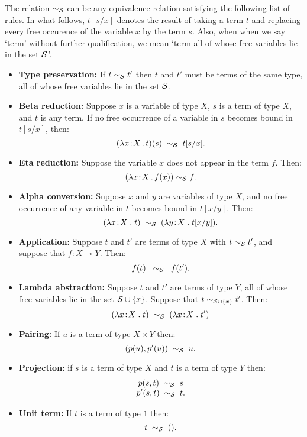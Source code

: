 \documentclass[12pt]{article}
\newcommand{\lhom}{\multimap}
\begin{document}
The relation $\sim_{\cal S}$ can be any equivalence relation
satisfying the following list of rules.  In what follows, $t[s/x]$
denotes the result of taking a term $t$ and replacing every free
occurence of the variable $x$ by the term $s$.  Also, when when we say
`term' without further qualification, we mean `term all of whose free
variables lie in the set ${\cal S}$'.
\begin{itemize}
\item {\bf Type preservation:} If $t \sim_{\cal S} t'$ then 
$t$ and $t'$ must be terms of the same type, all of whose free variables
lie in the set $\cal S$.
\item {\bf Beta reduction:} Suppose $x$ is a variable of
type $X$, $s$ is a term of type $X$, and $t$ is any term.
If no free occurrence of a variable 
in $s$ becomes bound in $t[s/x]$, then:
\[    (\lambda x\!:\!X\,.\, t)(s) { \;\; {\sim}_{\cal S} \;\; } t[s/x] .\]
\item {\bf Eta reduction:} Suppose the variable $x$ does not appear in the 
term $f$.  Then:
\[        (\lambda x\! : \! X \, .\, f(x)) {\; {\sim}_{\cal S} \; } f . \]
\item {\bf Alpha conversion:}  Suppose $x$ and $y$ are variables of
type $X$, and no free occurrence of any variable in $t$ becomes bound 
in $t[x/y]$.  Then:
\[        (\lambda x\! : \! X \; . \; t) \;\; {\sim}_{\cal S} \;\;
(\lambda y\!:\!X \; . \; t[x/y]). \]
\item {\bf Application:} 
Suppose $t$ and $t'$ are terms of type $X$ with $t \sim_{\cal S} t'$, 
and suppose that $f\! :\! X \lhom Y$.  Then:
\[       f(t) \;\; \sim_{\cal S} \;\;  f(t').  \]
\item {\bf Lambda abstraction:}
Suppose $t$ and $t'$ are terms of type $Y$, all of whose 
free variables lie in the set ${\cal S} \cup \{x\}$.  Suppose 
that $t \sim_{{\cal S} \cup \{ x \}} t'$.  Then:
\[        (\lambda x\! : \! X \; . \; t) \;\; {\sim}_{\cal S} \;\;
(\lambda x\!:\!X \; . \; t') \]
\item {\bf Pairing:} If $u$ is a term of type $X \times Y$ then:
\[  (p(u),p'(u)) \;\; {\sim}_{\cal S} \;\; u .\]
\item {\bf Projection:} if  $s$ is a term of type $X$ and $t$
is a term of type $Y$ then:
\[
\begin{array}{c}
p(s,t) \;\; {\sim}_{\cal S} \;\;  s  \\
p'(s,t) \;\; {\sim}_{\cal S} \;\;  t.
\end{array}
\]
\item {\bf Unit term:} If $t$ is a term of type $1$ then:
\[          t \;\; {\sim}_{\cal S} \;\;  ().  \]
\end{itemize}
\end{document}
